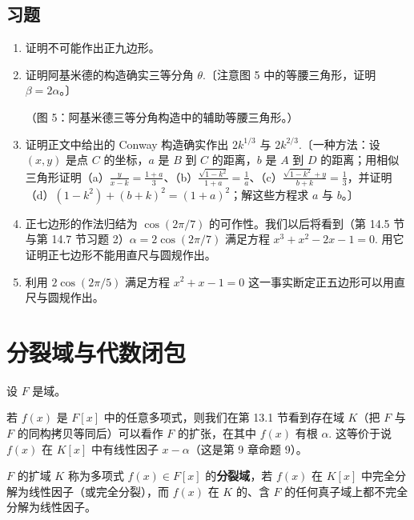 \subsection*{习题}

\begin{enumerate}
\item 证明不可能作出正九边形。

\item 证明阿基米德的构造确实三等分角 \(\theta\).〔注意图 5 中的等腰三角形，证明 \(\beta = 2\alpha\)。〕
\begin{center}（图 5：阿基米德三等分角构造中的辅助等腰三角形。）\end{center}

\item 证明正文中给出的 Conway 构造确实作出 \(2k^{1/3}\) 与 \(2k^{2/3}\).〔一种方法：设 \((x, y)\) 是点 \(C\) 的坐标，\(a\) 是 \(B\) 到 \(C\) 的距离，\(b\) 是 \(A\) 到 \(D\) 的距离；用相似三角形证明（a）\(\frac{y}{x-k} = \frac{1+a}{3}\)、（b）\(\frac{\sqrt{1-k^2}}{1+a} = \frac{1}{a}\)、（c）\(\frac{\sqrt{1-k^2}+y}{b+k} = \frac{1}{3}\)，并证明（d）\((1-k^2)+(b+k)^2 = (1+a)^2\)；解这些方程求 \(a\) 与 \(b\)。〕

\item 正七边形的作法归结为 \(\cos(2\pi/7)\) 的可作性。我们以后将看到（第 14.5 节与第 14.7 节习题 2）\(\alpha = 2\cos(2\pi/7)\) 满足方程 \(x^3+x^2-2x-1 = 0\). 用它证明正七边形不能用直尺与圆规作出。

\item 利用 \(2\cos(2\pi/5)\) 满足方程 \(x^2+x-1 = 0\) 这一事实断定正五边形可以用直尺与圆规作出。
\end{enumerate}

\section{分裂域与代数闭包}

设 \(F\) 是域。

若 \(f(x)\) 是 \(F[x]\) 中的任意多项式，则我们在第 13.1 节看到存在域 \(K\)（把 \(F\) 与 \(F\) 的同构拷贝等同后）可以看作 \(F\) 的扩张，在其中 \(f(x)\) 有根 \(\alpha\). 这等价于说 \(f(x)\) 在 \(K[x]\) 中有线性因子 \(x-\alpha\)（这是第 9 章命题 9）。

\begin{definition}
\(F\) 的扩域 \(K\) 称为多项式 \(f(x) \in F[x]\) 的\textbf{分裂域}，若 \(f(x)\) 在 \(K[x]\) 中完全分解为线性因子（或完全分裂），而 \(f(x)\) 在 \(K\) 的、含 \(F\) 的任何真子域上都不完全分解为线性因子。
\end{definition}

